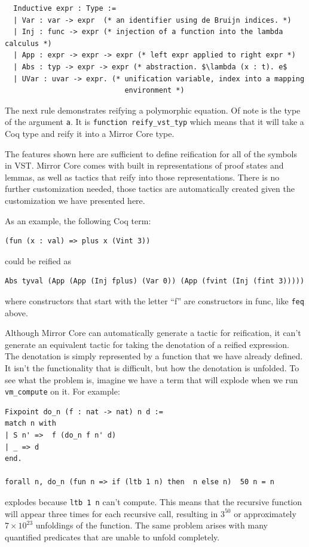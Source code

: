 \documentclass{puthesis}
\begin{document}
\begin{lstlisting}
  Inductive expr : Type :=
  | Var : var -> expr  (* an identifier using de Bruijn indices. *)
  | Inj : func -> expr (* injection of a function into the lambda calculus *)
  | App : expr -> expr -> expr (* left expr applied to right expr *)
  | Abs : typ -> expr -> expr (* abstraction. $\lambda (x : t). e$ 
  | UVar : uvar -> expr. (* unification variable, index into a mapping
                            environment *)
\end{lstlisting}

The next rule demonstrates reifying a polymorphic equation. Of note is
the type of the argument \lstinline|a|. It is 
\lstinline|function reify_vst_typ| which means that it will take a Coq type and reify it
into a Mirror Core type.

The features shown here are sufficient to define reification for all
of the symbols in VST. Mirror Core comes with built in representations
of proof states and lemmas, as well as tactics that reify into those
representations. There is no further customization needed, those
tactics are automatically created given the customization we have
presented here.

As an example, the following Coq term:

\begin{lstlisting}
(fun (x : val) => plus x (Vint 3))
\end{lstlisting}

could be reified as

\begin{lstlisting}
Abs tyval (App (App (Inj fplus) (Var 0)) (App (fvint (Inj (fint 3)))))
\end{lstlisting}

where constructors that start with the letter ``f'' are constructors
in func, like \lstinline|feq| above.

Although Mirror Core can automatically generate a tactic for
reification, it can't generate an equivalent tactic for taking the
denotation of a reified expression. The denotation is simply
represented by a function that we have already defined. It isn't the
functionality that is difficult, but how the denotation is
unfolded. To see what the problem is, imagine we have a term that will
explode when we run \lstinline|vm_compute| on it. For example:

\begin{lstlisting}
Fixpoint do_n (f : nat -> nat) n d :=
match n with
| S n' =>  f (do_n f n' d)
| _ => d
end.

forall n, do_n (fun n => if (ltb 1 n) then  n else n)  50 n = n
\end{lstlisting}
explodes because \lstinline|ltb 1 n| can't compute. This means that
the recursive function will appear three times for each recursive
call, resulting in $3^{50}$ or approximately $7\times 10^{23}$ unfoldings
of the function. The same problem arises with many quantified
predicates that are unable to unfold completely. 
\end{document}
